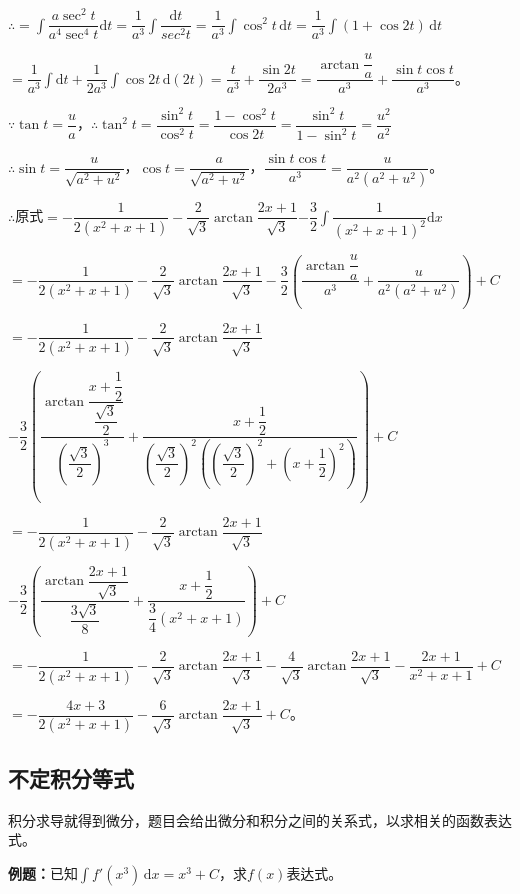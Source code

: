 \documentclass[UTF8, 12pt]{ctexart}
\begin{document}
$\therefore=\displaystyle{\int\dfrac{a\sec^2t}{a^4\sec^4t}\textrm{d}t=\dfrac{1}{a^3}\int\dfrac{\textrm{d}t}{sec^2t}}=\dfrac{1}{a^3}\int\cos^2t\,\textrm{d}t=\dfrac{1}{a^3}\int(1+\cos2t)\,\textrm{d}t$

$=\dfrac{1}{a^3}\int\textrm{d}t+\dfrac{1}{2a^3}\int\cos2t\,\textrm{d}(2t)=\dfrac{t}{a^3}+\dfrac{\sin2t}{2a^3}=\dfrac{\arctan\dfrac{u}{a}}{a^3}+\dfrac{\sin t\cos t}{a^3}$。

$\because\tan t=\dfrac{u}{a}$，$\therefore\tan^2t=\dfrac{\sin^2t}{\cos^2t}=\dfrac{1-\cos^2t}{\cos2t}=\dfrac{\sin^2t}{1-\sin^2t}=\dfrac{u^2}{a^2}$

$\therefore\sin t=\dfrac{u}{\sqrt{a^2+u^2}}$，$\cos t=\dfrac{a}{\sqrt{a^2+u^2}}$，$\dfrac{\sin t\cos t}{a^3}=\dfrac{u}{a^2(a^2+u^2)}$。

$\therefore$原式$=-\dfrac{1}{2(x^2+x+1)}-\dfrac{2}{\sqrt{3}}\arctan\dfrac{2x+1}{\sqrt{3}}\displaystyle{-\dfrac{3}{2}\int\dfrac{1}{(x^2+x+1)^2}\textrm{d}x}$

$=-\dfrac{1}{2(x^2+x+1)}-\dfrac{2}{\sqrt{3}}\arctan\dfrac{2x+1}{\sqrt{3}}-\dfrac{3}{2}\left(\dfrac{\arctan\dfrac{u}{a}}{a^3}+\dfrac{u}{a^2(a^2+u^2)}\right)+C$

$=-\dfrac{1}{2(x^2+x+1)}-\dfrac{2}{\sqrt{3}}\arctan\dfrac{2x+1}{\sqrt{3}}$

$-\dfrac{3}{2}\left(\dfrac{\arctan\dfrac{x+\dfrac{1}{2}}{\dfrac{\sqrt{3}}{2}}}{\left(\dfrac{\sqrt{3}}{2}\right)^3}+\dfrac{x+\dfrac{1}{2}}{\left(\dfrac{\sqrt{3}}{2}\right)^2\left(\left(\dfrac{\sqrt{3}}{2}\right)^2+\left(x+\dfrac{1}{2}\right)^2\right)}\right)+C$

$=-\dfrac{1}{2(x^2+x+1)}-\dfrac{2}{\sqrt{3}}\arctan\dfrac{2x+1}{\sqrt{3}}$

$-\dfrac{3}{2}\left(\dfrac{\arctan\dfrac{2x+1}{\sqrt{3}}}{\dfrac{3\sqrt{3}}{8}}+\dfrac{x+\dfrac{1}{2}}{\dfrac{3}{4}\left(x^2+x+1\right)}\right)+C$

$=-\dfrac{1}{2(x^2+x+1)}-\dfrac{2}{\sqrt{3}}\arctan\dfrac{2x+1}{\sqrt{3}}-\dfrac{4}{\sqrt{3}}\arctan\dfrac{2x+1}{\sqrt{3}}-\dfrac{2x+1}{x^2+x+1}+C$

$=-\dfrac{4x+3}{2(x^2+x+1)}-\dfrac{6}{\sqrt{3}}\arctan\dfrac{2x+1}{\sqrt{3}}+C$。

\subsection{不定积分等式}

积分求导就得到微分，题目会给出微分和积分之间的关系式，以求相关的函数表达式。

\textbf{例题：}已知$\int f'(x^3)\,\textrm{d}x=x^3+C$，求$f(x)$表达式。
\end{document}

